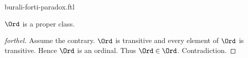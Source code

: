 \documentclass{naproche-library}
\begin{document}
\begin{smodule}{burali-forti-paradox.ftl}

  \begin{theorem*}[forthel,title=Burali-Forti's Paradox,id=burali_forti_paradox]
    $\Ord$ is a proper class.
  \end{theorem*}
  \begin{proof}[forthel]
    Assume the contrary.
    $\Ord$ is transitive and every element of $\Ord$ is transitive.
    Hence $\Ord$ is an ordinal.
    Thus $\Ord \in \Ord$.
    Contradiction.
  \end{proof}
\end{smodule}
\end{document}
